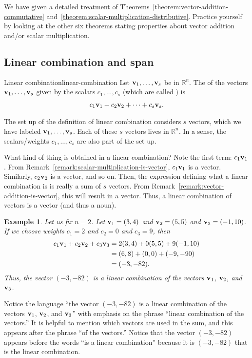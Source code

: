 \documentclass{book}
\newcounter{ekcounter}%
\theoremstyle{ekimcustom}
\newtheorem{example}[ekcounter]{Example}
\newcommand\defn[1]{{\color{blue}{\bf #1}}}
\begin{document}
We have given a detailed treatment of Theorems~\ref{theorem:vector-addition-commutative} and~\ref{theorem:scalar-multiplication-distributive}. Practice yourself by looking at the other six theorems stating properties about vector addition and/or scalar multiplication.

\subsection{Linear combination and span}

\begin{bdefinition}{Linear combination}{linear-combination}
Let ${\bf v}_1, \dots, {\bf v}_s$ be in $\mathbb{R}^n$. The \defn{linear combination} of the vectors ${\bf v}_1, \dots, {\bf v}_s$ given by the scalars $c_1,\dots,c_s$ (which are called \defn{weights}) is
\[ c_1{\bf v}_1 + c_2{\bf v}_2 + \dots + c_s{\bf v}_s.\]
\end{bdefinition}
The set up of the definition of linear combination considers $s$ vectors, which we have labeled ${\bf v}_1, \dots, {\bf v}_s$. Each of these $s$ vectors lives in $\mathbb{R}^n$. In a sense, the scalars/weights $c_1,\dots,c_s$ are also part of the set up.

What kind of thing is obtained in a linear combination? Note the first term: $c_1{\bf v}_1$. From Remark~\ref{remark:scalar-multiplication-is-vector}, $c_1{\bf v}_1$ is a vector. Similarly, $c_2{\bf v}_2$ is a vector, and so on. Then, the expression defining what a linear combination is is really a sum of $s$ vectors. From Remark~\ref{remark:vector-addition-is-vector}, this will result in a vector. Thus, a linear combination of vectors is a vector (and thus a noun).
\begin{example}
Let us fix $n=2$. Let ${\bf v}_1 = (3,4)$ and ${\bf v}_2=(5,5)$ and ${\bf v}_3=(-1,10)$. If we choose weights $c_1=2$ and $c_2=0$ and $c_3=9$, then
\begin{align*}
c_1{\bf v}_1 + c_2{\bf v}_2 +  c_3{\bf v}_3
&= 2(3,4) + 0(5,5) + 9(-1,10)\\
&= (6,8)+(0,0)+(-9,-90)\\
&= (-3,-82).
\end{align*}
Thus, the vector $(-3,-82)$ is a linear combination of the vectors ${\bf v}_1$, ${\bf v}_2$, and ${\bf v}_3$. 
\end{example}
\begin{blanguage}{}{}
Notice the language ``the vector $(-3,-82)$ is a linear combination of the vectors ${\bf v}_1$, ${\bf v}_2$, and ${\bf v}_3$'' with emphasis on the phrase ``linear combination of the vectors.'' It is helpful to mention which vectors are used in the sum, and this appears after the phrase ``of the vectors.'' Notice that the vector $(-3,-82)$ appears before the words ``is a linear combination'' because it is $(-3,-82)$ that is the linear combination.
\end{blanguage}
\end{document}
